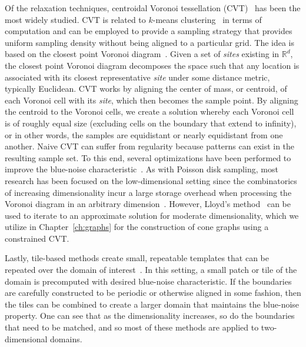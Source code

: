 Of the relaxation techniques, centroidal Voronoi tessellation (CVT)~\cite{DuFaberGunzburger1999} has been the most widely studied.
%
CVT is related to $k$-means clustering~\cite{HastieTibshiraniFriedman2008} in terms of computation and can be employed to provide a sampling strategy that provides uniform sampling density without being aligned to a particular grid.
%
The idea is based on the closest point Voronoi diagram~\cite{deBergCheongKreveld2008}.
%
Given a set of \emph{sites} existing in $\mathbb{R}^d$, the closest point Voronoi diagram decomposes the space such that any location is associated with its closest representative \emph{site} under some distance metric, typically Euclidean.
%
CVT works by aligning the center of mass, or centroid, of each Voronoi cell with its \emph{site}, which then becomes the sample point.
%
By aligning the centroid to the Voronoi cells, we create a solution whereby each Voronoi cell is of roughly equal size (excluding cells on the boundary that extend to infinity), or in other words, the samples are equidistant or nearly equidistant from one another.
%
Naive CVT can suffer from regularity because patterns can exist in the resulting sample set.
%
To this end, several optimizations have been performed to improve the blue-noise characteristic~\cite{BalzerSchlomerDeussen2009,ChenYuanChoi2012,deGoesBreedenOstromoukhov2012,XuLiuGotsman2011}.
%
As with Poisson disk sampling, most research has been focused on the low-dimensional setting since the combinatorics of increasing dimensionality incur a large storage overhead when processing the Voronoi diagram in an arbitrary dimension~\cite{BoissonnatChazalYvinec2017}.
%
However, Lloyd's method~\cite{DuFaberGunzburger1999} can be used to iterate to an approximate solution for moderate dimensionality, which we utilize in Chapter~\ref{ch:graphs} for the construction of cone graphs using a constrained CVT.

Lastly, tile-based methods create small, repeatable templates that can be repeated over the domain of interest~\cite{HillerDeussenKeller2001,KopfCohenOrDeussen2006,LagaeDutre2005,Ostromoukhov2007,OstromoukhovDonohueJodoin2004,WachtelPilleboueCoeurjolly2014}.
%
In this setting, a small patch or tile of the domain is precomputed with desired blue-noise characteristic.
%
If the boundaries are carefully constructed to be periodic or otherwise aligned in some fashion, then the tiles can be combined to create a larger domain that maintains the blue-noise property.
%
One can see that as the dimensionality increases, so do the boundaries that need to be matched, and so most of these methods are applied to two-dimensional domains.

